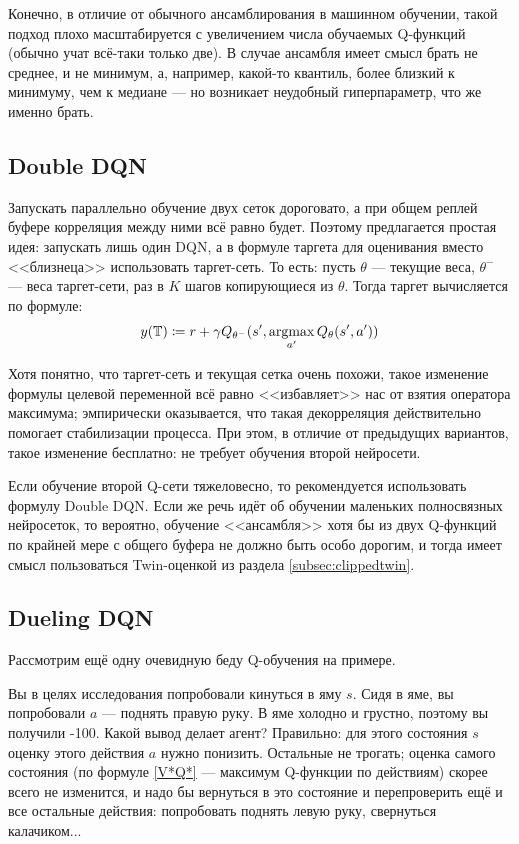 \begin{remark}
Конечно, в отличие от обычного ансамблирования в машинном обучении, такой подход плохо масштабируется с увеличением числа обучаемых Q-функций (обычно учат всё-таки только две). В случае ансамбля имеет смысл брать не среднее, и не минимум, а, например, какой-то квантиль, более близкий к минимуму, чем к медиане --- но возникает неудобный гиперпараметр, что же именно брать.
\end{remark}

\subsection{Double DQN}\label{subsec:doubledqn}

Запускать параллельно обучение двух сеток дороговато, а при общем реплей буфере корреляция между ними всё равно будет. Поэтому предлагается простая идея: запускать лишь один DQN, а в формуле таргета для оценивания вместо <<близнеца>> использовать таргет-сеть. То есть: пусть $\theta$ --- текущие веса, $\theta^{-}$ --- веса таргет-сети, раз в $K$ шагов копирующиеся из $\theta$. Тогда таргет вычисляется по формуле:
$$y(\mathbb{T} ) \coloneqq r + \gamma Q_{\theta^{-}}(s', \mathop{\mathrm{argmax}}\limits_{a'} Q_{\theta}(s', a'))$$

Хотя понятно, что таргет-сеть и текущая сетка очень похожи, такое изменение формулы целевой переменной всё равно <<избавляет>> нас от взятия оператора максимума; эмпирически оказывается, что такая декорреляция действительно помогает стабилизации процесса. При этом, в отличие от предыдущих вариантов, такое изменение бесплатно: не требует обучения второй нейросети.

\begin{remark}
Если обучение второй Q-сети тяжеловесно, то рекомендуется использовать формулу Double DQN. Если же речь идёт об обучении маленьких полносвязных нейросеток, то вероятно, обучение <<ансамбля>> хотя бы из двух Q-функций по крайней мере с общего буфера не должно быть особо дорогим, и тогда имеет смысл пользоваться Twin-оценкой из раздела \ref{subsec:clippedtwin}.
\end{remark}

\subsection{Dueling DQN}\label{subsec:duelingdqn}

Рассмотрим ещё одну очевидную беду Q-обучения на примере. 

\begin{example}
Вы в целях исследования попробовали кинуться в яму $s$. Сидя в яме, вы попробовали $a$ --- поднять правую руку. В яме холодно и грустно, поэтому вы получили -100. Какой вывод делает агент? Правильно: для этого состояния $s$ оценку этого действия $a$ нужно понизить. Остальные не трогать; оценка самого состояния (по формуле \eqref{V*Q*} --- максимум Q-функции по действиям) скорее всего не изменится, и надо бы вернуться в это состояние и перепроверить ещё и все остальные действия: попробовать поднять левую руку, свернуться калачиком...
\end{example}

